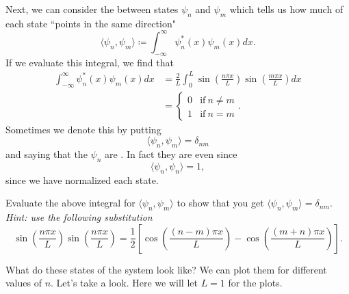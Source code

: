 Next, we can consider the  between states $\psi_n$ and $\psi_m$ which tells us how much of each state ``points in the same direction"
\[
\langle \psi_n,\psi_m \rangle \coloneqq \int_{-\infty}^\infty \psi_n^*(x) \psi_m(x) dx.
\]
If we evaluate this integral, we find that
\begin{align*}
    \int_{-\infty}^\infty \psi_n^*(x)\psi_m(x)dx&= \frac{2}{L}\int_0^L \sin\left( \frac{n\pi x}{L}\right)\sin\left( \frac{m\pi x}{L}\right)dx\\
    &= \begin{cases} 0 &\textrm{if}~ n\neq m\\
    1 & \textrm{if}~ n=m\end{cases}.
\end{align*}
Sometimes we denote this by putting
\[
\langle \psi_n,\psi_m\rangle = \delta_{nm}
\]
and saying that the $\psi_n$ are . In fact they are even  since
\[
\langle \psi_n,\psi_n\rangle = 1,
\]
since we have normalized each state.
\begin{exercise}
Evaluate the above integral for $\langle \psi_n, \psi_m \rangle$ to show that you get $\langle \psi_n,\psi_m\rangle = \delta_{nm}$.  \emph{Hint: use the following substitution}
\[
\sin\left(\frac{n\pi x}{L}\right)\sin\left(\frac{n\pi x}{L}\right) =\frac{1}{2}\left[ \cos\left( \frac{(n-m)\pi x}{L} \right) - \cos\left( \frac{(m+n)\pi x}{L}\right)\right].
\]
\end{exercise}
What do these states of the system look like? We can plot them for different values of $n$. Let's take a look. Here we will let $L=1$ for the plots.
